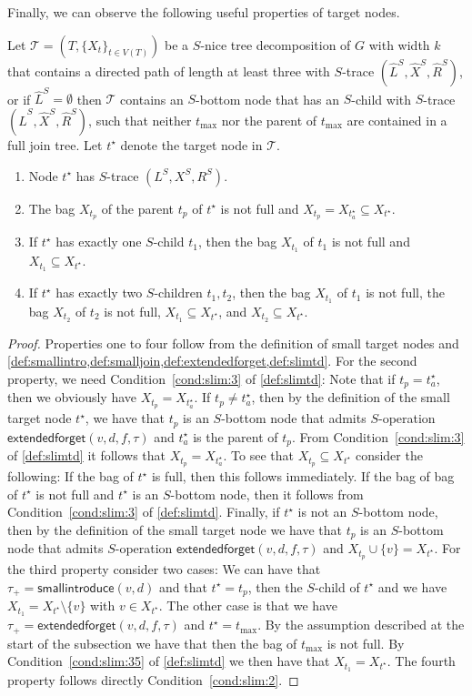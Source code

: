 \documentclass[a4paper,UKenglish,cleveref, autoref, thm-restate, numberwithinsect]{lipics-v2021}
\newcommand{\smallintroduce}{\mathsf{smallintroduce}}
\newcommand{\extendedforget}{\mathsf{extendedforget}}
\newcommand{\slim}{\text{slim}\xspace}
\begin{document}
Finally, we can observe the following useful properties of target nodes.
\begin{observation}\label{obs:smallneighbors}
Let $\mathcal{T}=(T,\{X_t\}_{t\in V(T)})$ be a \slim $S$-nice tree decomposition of $G$ with width $k$ that contains a directed path of length at least three with $S$-trace $(\hat{L}^S, \hat{X}^S, \hat{R}^S)$, or if $\hat{L}^S=\emptyset$ then $\mathcal{T}$ contains an $S$-bottom node that has an $S$-child with $S$-trace $(\hat{L}^S, \hat{X}^S, \hat{R}^S)$, such that neither $t_{\max}$ nor the parent of $t_{\max}$ are contained in a full join tree. Let ${t^\star}$ denote the target node in $\mathcal{T}$.
\begin{enumerate}
	\item Node ${t^\star}$ has $S$-trace $(L^S, X^S, R^S)$. \item The bag $X_{t_p}$ of the parent $t_p$ of ${t^\star}$ is not full and  $X_{t_p}=X_{t^\star_a}\subseteq X_{t^\star}$.
	\item If ${t^\star}$ has exactly one $S$-child $t_1$, then the bag $X_{t_1}$ of $t_1$ is not full and $X_{t_1}\subseteq X_{t^\star}$. \item If ${t^\star}$ has exactly two $S$-children $t_1, t_2$, then 
the bag $X_{t_1}$ of $t_1$ is not full,
the bag $X_{t_2}$ of $t_2$ is not full, $X_{t_1}\subseteq X_{t^\star}$, and $X_{t_2}\subseteq X_{t^\star}$. \end{enumerate}
\end{observation}
\begin{proof}
Properties one to four follow from the definition of small target nodes and \cref{def:smallintro,def:smalljoin,def:extendedforget,def:slimtd}. For the second property, we need Condition~\ref{cond:slim:3} of \cref{def:slimtd}: Note that if $t_p=t^\star_a$, then we obviously have $X_{t_p}=X_{t^\star_a}$. If $t_p\neq t^\star_a$, then by the definition of the small target node $t^\star$, we have that $t_p$ is an $S$-bottom node that admits $S$-operation $\extendedforget(v,d,f,\tau)$ and $t^\star_a$ is the parent of $t_p$. From Condition~\ref{cond:slim:3} of \cref{def:slimtd} it follows that $X_{t_p}=X_{t^\star_a}$.
To see that $X_{t_p}\subseteq X_{t^\star}$ consider the following: If the bag of $t^\star$ is full, then this follows immediately. If the bag of bag of $t^\star$ is not full and $t^\star$ is an $S$-bottom node, then it follows from Condition~\ref{cond:slim:3} of \cref{def:slimtd}. Finally, if $t^\star$ is not an $S$-bottom node, then by the definition of the small target node we have that $t_p$ is an $S$-bottom node that admits $S$-operation $\extendedforget(v,d,f,\tau)$ and $X_{t_p}\cup\{v\}= X_{t^\star}$.
For the third property consider two cases: We can have that $\tau_+=\smallintroduce(v,d)$ and that $t^\star=t_p$, then the $S$-child of $t^\star$ and we have $X_{t_1}= X_{t^\star}\setminus \{v\}$ with $v\in X_{t^\star}$.
The other case is that we have  $\tau_+=\extendedforget(v,d,f,\tau)$ and $t^\star=t_{\max}$. By the assumption described at the start of the subsection we have that then the bag of $t_{\max}$ is not full.
By Condition~\ref{cond:slim:35} of \cref{def:slimtd} we then have that $X_{t_1}= X_{t^\star}$. The fourth property follows directly Condition~\ref{cond:slim:2}.
\end{proof}
\end{document}
